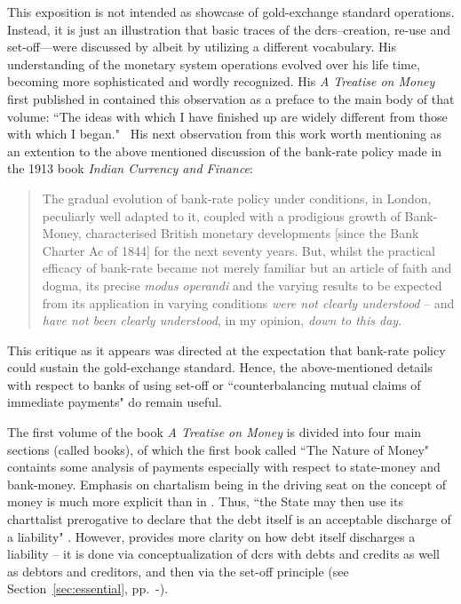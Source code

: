 This exposition is not intended as showcase of gold-exchange standard operations. Instead, it is just an illustration that basic traces of the \acfp{dcr}--creation, re-use and set-off---were discussed by \citeauthor{keynes1971_1} albeit by utilizing a different vocabulary. His understanding of the monetary system operations evolved over his life time, becoming more sophisticated and wordly recognized. His \textit{A Treatise on Money} first published in \citeyear{keynes1930a} contained this observation as a preface to the main body of that volume: ``The ideas with which I have finished up are widely different from those with which I began."~\citep[p.~vi]{keynes1930a} His next observation from this work worth mentioning as an extention to the above mentioned discussion of the bank-rate policy made in the 1913 book \textit{Indian Currency and Finance}:

\begin{quote}
The gradual evolution of bank-rate policy under conditions, in London, peculiarly well adapted to it, coupled with a prodigious growth of Bank-Money, characterised British monetary developments [since the Bank Charter Ac of 1844] for the next seventy years. But, whilst the practical efficacy of bank-rate became not merely familiar but an article of faith and dogma, its precise \textit{modus operandi} and the varying results to be expected from its application in varying conditions \textit{were not clearly understood} -- and \textit{have not been clearly understood}, in my opinion, \textit{down to this day.}~\cite[p.~17, emphasis added]{keynes1930a}
\end{quote}

This critique as it appears was directed at the expectation that bank-rate policy could sustain the gold-exchange standard. Hence, the above-mentioned details with respect to banks of using set-off or ``counterbalancing mutual claims of immediate payments" do remain useful. 

The first volume of the book \textit{A Treatise on Money} is divided into four main sections (called books), of which the first book called ``The Nature of Money" containts some analysis of payments especially with respect to state-money and bank-money. Emphasis on chartalism being in the driving seat on the concept of money is much more explicit than in \citeauthor{innes1913}. Thus, ``the State may then use its charttalist prerogative to declare that the debt itself is an acceptable discharge of a liability" \citep[p.~6]{keynes1930a}. However, \citeauthor{innes1913} provides more clarity on how debt itself discharges a liability -- it is done via conceptualization of \acfp{dcr} with debts and credits as well as debtors and creditors, and then via the set-off principle (see Section~\ref{sec:essential}, pp.~\pageref{sec:essential}-\pageref{sec:other_creditists}).

